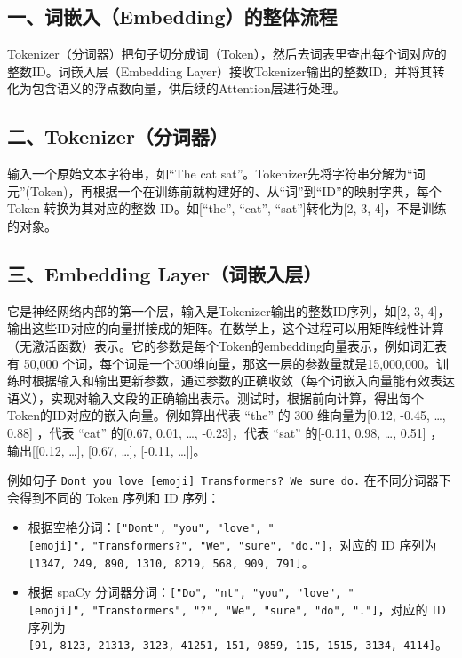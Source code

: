 \hypertarget{ux4e00ux8bcdux5d4cux5165embeddingux7684ux6574ux4f53ux6d41ux7a0b}{%
\subsection{一、词嵌入（Embedding）的整体流程}\label{ux4e00ux8bcdux5d4cux5165embeddingux7684ux6574ux4f53ux6d41ux7a0b}}

Tokenizer（分词器）把句子切分成词（Token），然后去词表里查出每个词对应的整数ID。词嵌入层（Embedding Layer）接收Tokenizer输出的整数ID，并将其转化为包含语义的浮点数向量，供后续的Attention层进行处理。

\hypertarget{ux4e8ctokenizerux5206ux8bcdux5668}{%
\subsection{二、Tokenizer（分词器）}\label{ux4e8ctokenizerux5206ux8bcdux5668}}

输入一个原始文本字符串，如``The cat sat''。Tokenizer先将字符串分解为``词元''(Token)，再根据一个在训练前就构建好的、从``词''到``ID''的映射字典，每个 Token 转换为其对应的整数 ID。如{[}``the'', ``cat'', ``sat''{]}转化为{[}2, 3, 4{]}，不是训练的对象。

\hypertarget{ux4e09embedding-layerux8bcdux5d4cux5165ux5c42}{%
\subsection{三、Embedding Layer（词嵌入层）}\label{ux4e09embedding-layerux8bcdux5d4cux5165ux5c42}}

它是神经网络内部的第一个层，输入是Tokenizer输出的整数ID序列，如{[}2, 3, 4{]}，输出这些ID对应的向量拼接成的矩阵。在数学上，这个过程可以用矩阵线性计算（无激活函数）表示。它的参数是每个Token的embedding向量表示，例如词汇表有 50,000 个词，每个词是一个300维向量，那这一层的参数量就是15,000,000。训练时根据输入和输出更新参数，通过参数的正确收敛（每个词嵌入向量能有效表达语义），实现对输入文段的正确输出表示。测试时，根据前向计算，得出每个Token的ID对应的嵌入向量。例如算出代表 ``the'' 的 300 维向量为{[}0.12, -0.45, \ldots, 0.88{]} ，代表 ``cat'' 的{[}0.67, 0.01, \ldots, -0.23{]}，代表 ``sat'' 的{[}-0.11, 0.98, \ldots, 0.51{]} ，输出{[}{[}0.12, \ldots{]}, {[}0.67, \ldots{]}, {[}-0.11, \ldots{]}{]}。

例如句子 \texttt{Don\textquotesingle{}t\ you\ love\ {[}emoji{]}\ Transformers?\ We\ sure\ do.} 在不同分词器下会得到不同的 Token 序列和 ID 序列：

\begin{itemize}
\tightlist
\item
  根据空格分词：\texttt{{[}"Don\textquotesingle{}t",\ "you",\ "love",\ "{[}emoji{]}",\ "Transformers?",\ "We",\ "sure",\ "do."{]}}，对应的 ID 序列为 \texttt{{[}1347,\ 249,\ 890,\ 1310,\ 8219,\ 568,\ 909,\ 791{]}}。
\item
  根据 spaCy 分词器分词：\texttt{{[}"Do",\ "n\textquotesingle{}t",\ "you",\ "love",\ "{[}emoji{]}",\ "Transformers",\ "?",\ "We",\ "sure",\ "do",\ "."{]}}，对应的 ID 序列为 \texttt{{[}91,\ 8123,\ 21313,\ 3123,\ 41251,\ 151,\ 9859,\ 115,\ 1515,\ 3134,\ 4114{]}}。
\end{itemize}

